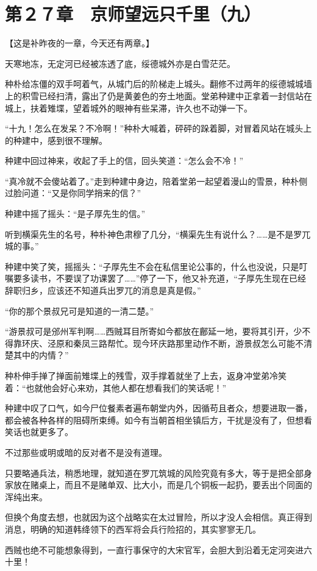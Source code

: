 \section{第２７章　京师望远只千里（九）}

【这是补昨夜的一章，今天还有两章。】

天寒地冻，无定河已经被冻透了底，绥德城外亦是白雪茫茫。

种朴给冻僵的双手呵着气，从城门后的阶梯走上城头。翻修不过两年的绥德城城墙上的积雪已经扫清，露出了仍是黄姜色的夯土地面。堂弟种建中正拿着一封信站在城上，扶着雉堞，望着城外的眼神有些呆滞，许久也不动弹一下。

“十九！怎么在发呆？不冷啊！”种朴大喊着，砰砰的跺着脚，对冒着风站在城头上的种建中，感到很不理解。

种建中回过神来，收起了手上的信，回头笑道：“怎么会不冷！”

“真冷就不会傻站着了。”走到种建中身边，陪着堂弟一起望着漫山的雪景，种朴侧过脸问道：“又是你同学捎来的信？”

种建中摇了摇头：“是子厚先生的信。”

听到横渠先生的名号，种朴神色肃穆了几分，“横渠先生有说什么？……是不是罗兀城的事。”

种建中笑了笑，摇摇头：“子厚先生不会在私信里论公事的，什么也没说，只是叮嘱要多读书，不要误了功课罢了……”停了一下，他又补充道，“子厚先生现在已经辞职归乡，应该还不知道兵出罗兀的消息是真是假。”

“你的那个景叔兄可是知道的一清二楚。”

“游景叔可是邠州军判啊……西贼耳目所寄如今都放在鄜延一地，要将其引开，少不得靠环庆、泾原和秦凤三路帮忙。现今环庆路那里动作不断，游景叔怎么可能不清楚其中的内情？”

种朴伸手掸了掸面前雉堞上的残雪，双手撑着就坐了上去，返身冲堂弟冷笑着：“也就他会好心来劝，其他人都在想看我们的笑话呢！”

种建中叹了口气，如今尸位餐素者遍布朝堂内外，因循苟且者众，想要进取一番，都会被各种各样的阻碍所束缚。如今有当朝首相坐镇后方，干扰是没有了，但想看笑话也就更多了。

不过那些或明或暗的反对者不是没有道理。

只要略通兵法，稍悉地理，就知道在罗兀筑城的风险究竟有多大，等于是把全部身家放在赌桌上，而且不是赌单双、比大小，而是几个铜板一起扔，要丢出个同面的浑纯出来。

但换个角度去想，也就因为这个战略实在太过冒险，所以才没人会相信。真正得到消息，明确的知道韩绛领下的西军将会兵行险招的，其实寥寥无几。

西贼也绝不可能想象得到，一直行事保守的大宋官军，会胆大到沿着无定河突进六十里！

